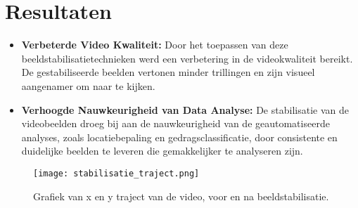 \section{Resultaten}
\begin{itemize}
  \item \textbf{Verbeterde Video Kwaliteit:} Door het toepassen van deze beeldstabilisatietechnieken werd een verbetering in de videokwaliteit bereikt. De gestabiliseerde beelden vertonen minder trillingen en zijn visueel aangenamer om naar te kijken.
  \item \textbf{Verhoogde Nauwkeurigheid van Data Analyse:} De stabilisatie van de videobeelden droeg bij aan de nauwkeurigheid van de geautomatiseerde analyses, zoals locatiebepaling en gedragsclassificatie, door consistente en duidelijke beelden te leveren die gemakkelijker te analyseren zijn.
\end{itemize}
\newline 
\begin{figure}[H]
  \centering
  \texttt{[image: stabilisatie\_traject.png]}
  \caption{Grafiek van x en y traject van de video, voor en na beeldstabilisatie.}
  \label{fig:stabilisatie_traject}  
\end{figure}